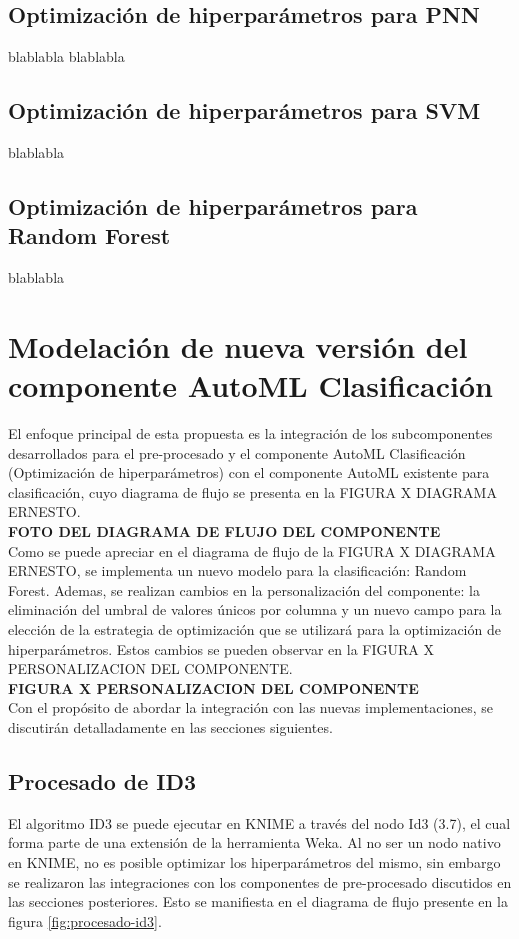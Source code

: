 \subsection{Optimización de hiperparámetros para PNN}
blablabla
blablabla

\subsection{Optimización de hiperparámetros para SVM}

blablabla

\subsection{Optimización de hiperparámetros para Random Forest}
blablabla



\section{Modelación de nueva versión del componente AutoML Clasificación}
El enfoque principal de esta propuesta es la integración de los subcomponentes desarrollados para el pre-procesado y el componente AutoML Clasificación (Optimización de hiperparámetros) con el componente AutoML existente para clasificación, cuyo diagrama de flujo se presenta en la FIGURA X DIAGRAMA ERNESTO. \\

\textbf{FOTO DEL DIAGRAMA DE FLUJO DEL COMPONENTE} \\

Como se puede apreciar en el diagrama de flujo de la FIGURA X DIAGRAMA ERNESTO, se implementa un nuevo modelo para la clasificación: Random Forest. Ademas, se realizan cambios en la personalización del componente: la eliminación del umbral de valores únicos por columna y un nuevo campo para la elección de la estrategia de optimización que se utilizará para la optimización de hiperparámetros. Estos cambios se pueden observar en la FIGURA X PERSONALIZACION DEL COMPONENTE. \\

\textbf{ FIGURA X PERSONALIZACION DEL COMPONENTE} \\

Con el propósito de abordar la integración con las nuevas implementaciones, se discutirán detalladamente en las secciones siguientes.

\subsection{Procesado de ID3}
El algoritmo ID3 se puede ejecutar en KNIME a través del nodo Id3 (3.7), el cual forma parte de una extensión de la herramienta Weka. Al no ser un nodo nativo en KNIME, no es posible optimizar los hiperparámetros del mismo, sin embargo se realizaron las integraciones con los componentes de pre-procesado discutidos en las secciones posteriores. Esto se manifiesta en el diagrama de flujo presente en la figura \ref{fig:procesado-id3}.

